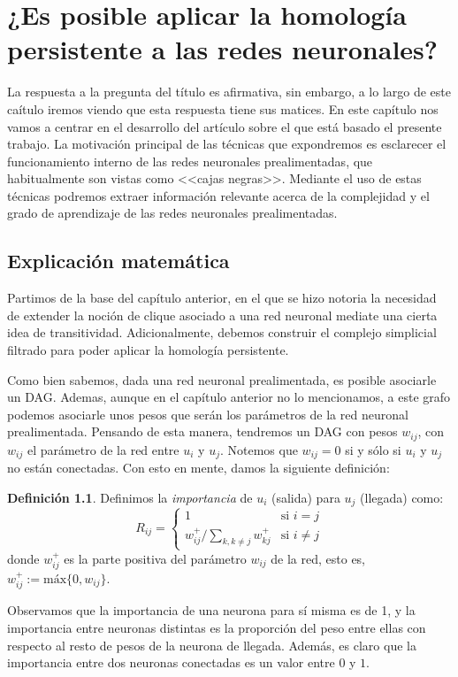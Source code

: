 \documentclass[12pt, a4paper, twoside]{book}
\numberwithin{equation}{section}
\theoremstyle{definition}
\newtheorem{defi}{Definición}[section]
\theoremstyle{remark}
\theoremstyle{plain}
\begin{document}
	\newpage

	\chapter{¿Es posible aplicar la homología persistente a las redes 
	neuronales?}
	
	La respuesta a la pregunta del título es afirmativa, sin embargo, a lo 
	largo de este caítulo iremos viendo que esta respuesta tiene sus 
	matices. En este capítulo nos vamos a centrar en el desarrollo del 
	artículo \cite{Articulo-Watanabe} sobre el que está basado el presente 
	trabajo. 
	La motivación principal de las técnicas que expondremos es esclarecer
	el funcionamiento interno de las redes neuronales prealimentadas, que 
	habitualmente son vistas como <<cajas negras>>. Mediante el uso de 
	estas técnicas podremos extraer información relevante acerca de la 
	complejidad y el grado de aprendizaje de las redes neuronales 
	prealimentadas. 

	\section{Explicación matemática}
	
	Partimos de la base del capítulo anterior, en el que se hizo notoria 
	la necesidad de extender la noción de clique asociado a una red 
	neuronal mediate una cierta idea de transitividad. Adicionalmente, 
	debemos construir el complejo simplicial filtrado para poder aplicar 
	la homología persistente.
	
	Como bien sabemos, dada una red neuronal prealimentada, es posible 
	asociarle un DAG. Ademas, aunque en el capítulo anterior no lo 
	mencionamos, a este grafo podemos asociarle unos pesos que serán los 
	parámetros de la red neuronal prealimentada. Pensando de esta manera, 
	tendremos un DAG con pesos $w_{ij}$, con $w_{ij}$ el parámetro de la 
	red entre $u_{i}$ y $u_{j}$. Notemos que $w_{ij}=0$ si y sólo si 
	$u_{i}$ y $u_{j}$ no están conectadas.
	Con esto en mente, damos la siguiente definición: 
	
	\begin{defi}
	Definimos la \textit{importancia} de $u_{i}$ (salida) para $u_{j}$ 
	(llegada) como:
	\begin{equation*}
		R_{ij}=  \left \{ 
			\begin{array}{ll}
				1 & \text{si } i=j \\
				w_{ij}^{+}/\sum_{k,k \neq j}w_{kj}^{+} & \text{si } i \neq j
			\end{array}
		\right. 
	\end{equation*}
	donde $w_{ij}^{+}$ es la parte positiva del parámetro $w_{ij}$ de la 
	red, esto es, $w_{ij}^{+}:=\text{máx}\{0,w_{ij}\}$. 
	\end{defi}
	Observamos que la importancia de una neurona para sí misma es de 1, y 
	la importancia entre neuronas distintas es la proporción del peso 
	entre ellas con respecto al resto de pesos de la neurona de llegada. 
	Además, es claro que la importancia entre dos neuronas conectadas es 
	un valor entre $0$ y $1$.
\end{document}
